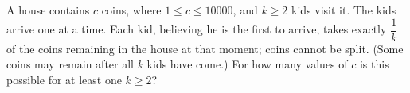 A house contains $c$ coins, where $1\le c\le10000$, and $k\ge2$ kids visit it. The kids arrive one at a time. Each kid, believing he is the first to arrive, takes exactly $\dfrac1k$ of the coins remaining in the house at that moment; coins cannot be split. (Some coins may remain after all $k$ kids have come.) For how many values of $c$ is this possible for at least one $k\ge2$?
